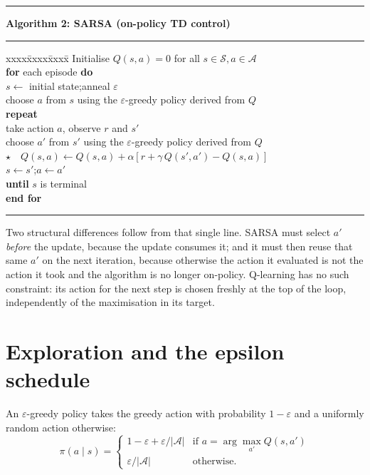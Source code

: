 \vspace{10pt}
\noindent\begin{minipage}{\textwidth}
\hrule
\vspace{4pt}
\textbf{Algorithm 2: SARSA (on-policy TD control)}
\vspace{2pt}
\hrule
\vspace{4pt}
{\small
\begin{tabbing}
xxxx\=xxxx\=xxxx\=\kill
Initialise $Q(s,a) = 0$ for all $s \in \mathcal{S}, a \in \mathcal{A}$ \\
\textbf{for} each episode \textbf{do} \\
\> $s \leftarrow$ initial state;\quad anneal $\varepsilon$ \\
\> choose $a$ from $s$ using the $\varepsilon$-greedy policy derived from $Q$ \\
\> \textbf{repeat} \\
\>\> take action $a$, observe $r$ and $s'$ \\
\>\> choose $a'$ from $s'$ using the $\varepsilon$-greedy policy derived from $Q$ \\
\>\> $\star$\ \ $Q(s,a) \leftarrow Q(s,a) + \alpha\left[r + \gamma\, Q(s',a') - Q(s,a)\right]$ \\
\>\> $s \leftarrow s'$;\quad $a \leftarrow a'$ \\
\> \textbf{until} $s$ is terminal \\
\textbf{end for}
\end{tabbing}}
\hrule
\end{minipage}
\vspace{6pt}

Two structural differences follow from that single line. SARSA must select $a'$ \emph{before} the
update, because the update consumes it; and it must then reuse that same $a'$ on the next
iteration, because otherwise the action it evaluated is not the action it took and the algorithm
is no longer on-policy. Q-learning has no such constraint: its action for the next step is chosen
freshly at the top of the loop, independently of the maximisation in its target.

\section{Exploration and the epsilon schedule}

An $\varepsilon$-greedy policy takes the greedy action with probability $1-\varepsilon$ and a
uniformly random action otherwise:
\begin{equation}
\pi(a \mid s) = \begin{cases}
1 - \varepsilon + \varepsilon/|\mathcal{A}| & \text{if } a = \arg\max_{a'} Q(s,a') \\
\varepsilon/|\mathcal{A}| & \text{otherwise.}
\end{cases}
\end{equation}

